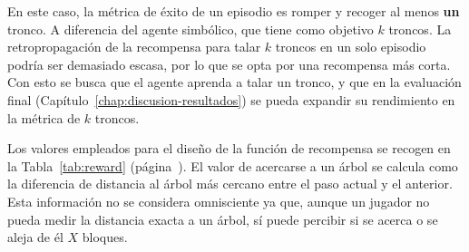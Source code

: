 En este caso, la métrica de éxito de un episodio es romper y recoger al menos \textbf{un} tronco.
A diferencia del agente simbólico, que tiene como objetivo $k$ troncos.
La retropropagación de la recompensa para talar $k$ troncos en un solo episodio podría ser demasiado escasa,
por lo que se opta por una recompensa más corta. Con esto se busca que el agente aprenda a talar un tronco, 
y que en la evaluación final (Capítulo~\ref{chap:discusion-resultados}) se pueda expandir su rendimiento en la métrica de $k$ troncos.

Los valores empleados para el diseño de la función de recompensa se recogen en la Tabla~\ref{tab:reward}
(página~\pageref{tab:reward}). El valor de acercarse a un árbol se calcula
como la diferencia de distancia al árbol más cercano entre el paso actual y el anterior.
Esta información no se considera omnisciente ya que, aunque un jugador no pueda medir la distancia exacta a un árbol, 
sí puede percibir si se acerca o se aleja de él $X$ bloques.

\begin{table}[htbp]
  \centering
  \caption[Términos de la función de recompensa]{Términos de la función de recompensa. Los valores
  positivos son mucho mayores que los negativos para favorecer el aprendizaje de la tarea principal.}
  \label{tab:reward}
\end{table}


